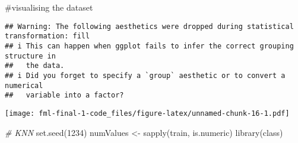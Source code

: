 \documentclass[
]{article}
\newenvironment{Shaded}{\begin{snugshade}}{\end{snugshade}}
\newcommand{\AttributeTok}[1]{\textcolor[rgb]{0.77,0.63,0.00}{#1}}
\newcommand{\CommentTok}[1]{\textcolor[rgb]{0.56,0.35,0.01}{\textit{#1}}}
\newcommand{\DecValTok}[1]{\textcolor[rgb]{0.00,0.00,0.81}{#1}}
\newcommand{\FloatTok}[1]{\textcolor[rgb]{0.00,0.00,0.81}{#1}}
\newcommand{\FunctionTok}[1]{\textcolor[rgb]{0.00,0.00,0.00}{#1}}
\newcommand{\NormalTok}[1]{#1}
\newcommand{\OtherTok}[1]{\textcolor[rgb]{0.56,0.35,0.01}{#1}}
\newcommand{\SpecialCharTok}[1]{\textcolor[rgb]{0.00,0.00,0.00}{#1}}
\newcommand{\StringTok}[1]{\textcolor[rgb]{0.31,0.60,0.02}{#1}}
\begin{document}
\#visualising the dataset

\begin{Shaded}
\end{Shaded}

\begin{verbatim}
## Warning: The following aesthetics were dropped during statistical transformation: fill
## i This can happen when ggplot fails to infer the correct grouping structure in
##   the data.
## i Did you forget to specify a `group` aesthetic or to convert a numerical
##   variable into a factor?
\end{verbatim}

\texttt{[image: fml-final-1-code\_files/figure-latex/unnamed-chunk-16-1.pdf]}

\begin{Shaded}
\begin{Highlighting}[]
\CommentTok{\# KNN}
\FunctionTok{set.seed}\NormalTok{(}\DecValTok{1234}\NormalTok{)}
\NormalTok{numValues }\OtherTok{\textless{}{-}} \FunctionTok{sapply}\NormalTok{(train, is.numeric)}
\FunctionTok{library}\NormalTok{(class)}
\end{Highlighting}
\end{Shaded}

\begin{Shaded}
\end{Shaded}
\end{document}
